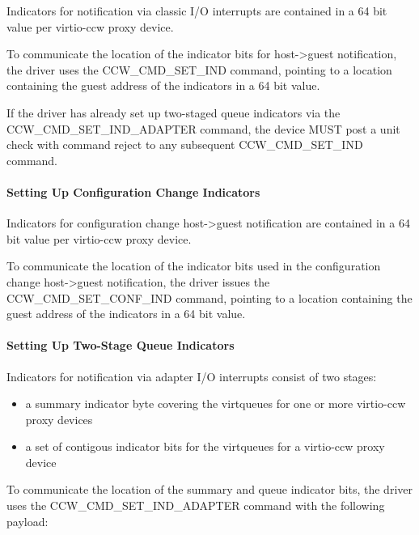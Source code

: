 Indicators for notification via classic I/O interrupts are contained
in a 64 bit value per virtio-ccw proxy device.

To communicate the location of the indicator bits for host->guest
notification, the driver uses the CCW_CMD_SET_IND command,
pointing to a location containing the guest address of the
indicators in a 64 bit value.

If the driver has already set up two-staged queue indicators via the
CCW_CMD_SET_IND_ADAPTER command, the device MUST post a unit check
with command reject to any subsequent CCW_CMD_SET_IND command.

\paragraph{Setting Up Configuration Change Indicators}\label{sec:Virtio Transport Options / Virtio over channel I/O / Device Initialization / Setting Up Indicators / Setting Up Configuration Change Indicators}

Indicators for configuration change host->guest notification are
contained in a 64 bit value per virtio-ccw proxy device.

To communicate the location of the indicator bits used in the
configuration change host->guest notification, the driver issues the
CCW_CMD_SET_CONF_IND command, pointing to a location containing the
guest address of the indicators in a 64 bit value.

\paragraph{Setting Up Two-Stage Queue Indicators}\label{sec:Virtio Transport Options / Virtio over channel I/O / Device Initialization / Setting Up Indicators / Setting Up Two-Stage Queue Indicators}

Indicators for notification via adapter I/O interrupts consist of
two stages:
\begin{itemize}
\item a summary indicator byte covering the virtqueues for one or more
  virtio-ccw proxy devices
\item a set of contigous indicator bits for the virtqueues for a
  virtio-ccw proxy device
\end{itemize}

To communicate the location of the summary and queue indicator bits,
the driver uses the CCW_CMD_SET_IND_ADAPTER command with the following
payload:

